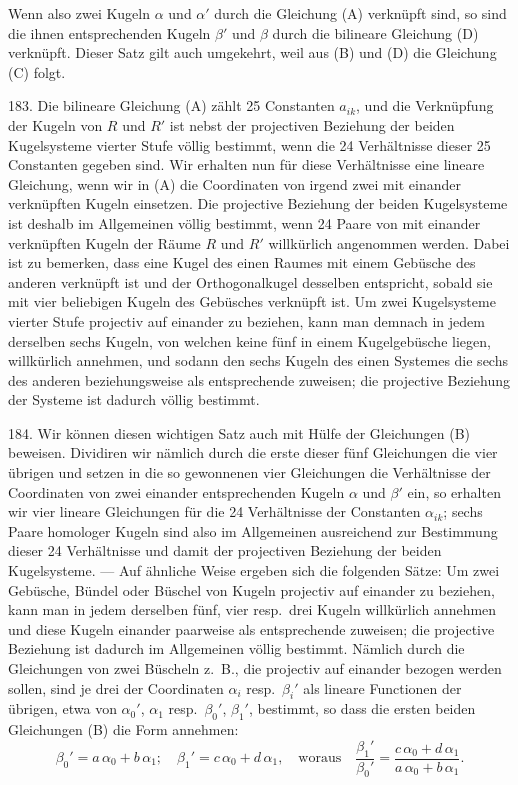 Wenn also zwei Kugeln $\alpha$ und $\alpha'$ durch die Gleichung (A)
verkn\"upft sind, so sind die ihnen entsprechenden Kugeln $\beta'$
und $\beta$ durch die bilineare Gleichung (D) verkn\"upft. Dieser
Satz gilt auch umgekehrt, weil aus (B) und (D) die Gleichung (C)
folgt.

183. Die bilineare Gleichung (A) z\"ahlt 25 Constanten $a_{ik}$,
und die Verkn\"upfung der Kugeln von $R$ und $R'$ ist nebst
der projectiven Beziehung der beiden Kugelsysteme vierter
Stufe v\"ollig bestimmt, wenn die 24 Verh\"altnisse dieser 25
Constanten gegeben sind. Wir erhalten nun f\"ur diese Verh\"altnisse
eine lineare Gleichung, wenn wir in (A) die Coordinaten
von irgend zwei mit einander verkn\"upften Kugeln
einsetzen. Die projective Beziehung der beiden Kugelsysteme
ist deshalb im Allgemeinen v\"ollig bestimmt, wenn 24 Paare
von mit einander verkn\"upften Kugeln der R\"aume $R$ und $R'$
willk\"urlich angenommen werden. Dabei ist zu bemerken,
dass eine Kugel des einen Raumes mit einem Geb\"usche des
anderen verkn\"upft ist und der Orthogonalkugel desselben
entspricht, sobald sie mit vier beliebigen Kugeln des Geb\"usches
verkn\"upft ist. Um zwei Kugelsysteme vierter Stufe
projectiv auf einander zu beziehen, kann man demnach in
jedem derselben sechs Kugeln, von welchen keine f\"unf in
einem Kugelgeb\"usche liegen, willk\"urlich annehmen, und sodann
den sechs Kugeln des einen Systemes die sechs des
anderen beziehungsweise als entsprechende zuweisen; die projective
Beziehung der Systeme ist dadurch v\"ollig bestimmt.

184. Wir k\"onnen diesen wichtigen Satz auch mit H\"ulfe
der Gleichungen (B) beweisen. Dividiren wir n\"amlich durch
die erste dieser f\"unf Gleichungen die vier \"ubrigen und setzen
in die so gewonnenen vier Gleichungen die Verh\"altnisse der
Coordinaten von zwei einander entsprechenden Kugeln $\alpha$
und $\beta'$ ein, so erhalten wir vier lineare Gleichungen f\"ur die
24 Verh\"altnisse der Constanten $\alpha_{ik}$; sechs Paare homologer
Kugeln sind also im Allgemeinen ausreichend zur Bestimmung
dieser 24 Verh\"altnisse und damit der projectiven Beziehung
der beiden Kugelsysteme. --- Auf \"ahnliche Weise ergeben
sich die folgenden S\"atze: Um zwei Geb\"usche, B\"undel oder
B\"uschel von Kugeln projectiv auf einander zu beziehen, kann
man in jedem derselben f\"unf, vier resp.\ drei Kugeln willk\"urlich
annehmen und diese Kugeln einander paarweise als
entsprechende zuweisen; die projective Beziehung ist dadurch
im Allgemeinen v\"ollig bestimmt. N\"amlich durch die Gleichungen
von zwei B\"uscheln z.~B., die projectiv auf einander
bezogen werden sollen, sind je drei der Coordinaten $\alpha_i$ resp.\ $\beta_i'$
als lineare Functionen der \"ubrigen, etwa von $\alpha_0'$, $\alpha_1$ resp.\ $\beta_0'$,
$\beta_1'$, bestimmt, so dass die ersten beiden Gleichungen (B)
die Form annehmen:
\[
\beta_0'=a\,\alpha_0+ b\,\alpha_1;\quad
\beta_1'=c\,\alpha_0+d\,\alpha_1,
\quad\text{woraus}\quad
\frac{\beta_1'}{\beta_0'}=\frac{c\,\alpha_0+d\,\alpha_1}{a\,\alpha_0+b\,\alpha_1}.
\]

